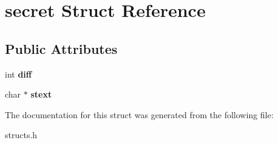 \hypertarget{structsecret}{\section{secret Struct Reference}
\label{structsecret}
}
\subsection*{Public Attributes}
\begin{DoxyCompactItemize}
\item 
\hypertarget{structsecret_aa40e4d7b2f1b1fd385efe3abc8b6724f}{int {\bfseries diff}}\label{structsecret_aa40e4d7b2f1b1fd385efe3abc8b6724f}

\item 
\hypertarget{structsecret_a13cce2403549ba2b368fa36c84d6ca87}{char $\ast$ {\bfseries stext}}\label{structsecret_a13cce2403549ba2b368fa36c84d6ca87}

\end{DoxyCompactItemize}


The documentation for this struct was generated from the following file\-:\begin{DoxyCompactItemize}
\item 
structs.\-h\end{DoxyCompactItemize}
